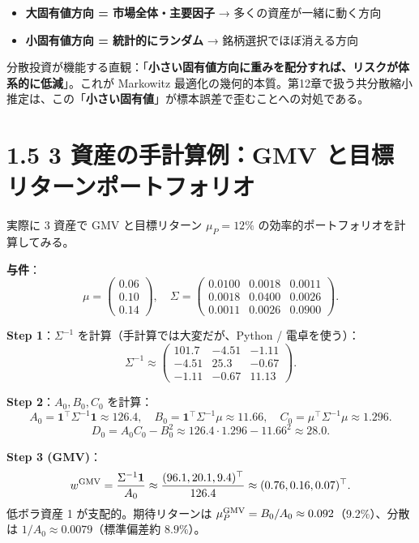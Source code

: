 \documentclass[11pt,a4paper]{report}
\begin{document}
\begin{itemize}
\item \textbf{大固有値方向 = 市場全体・主要因子} → 多くの資産が一緒に動く方向
\item \textbf{小固有値方向 = 統計的にランダム} → 銘柄選択でほぼ消える方向
\end{itemize}

分散投資が機能する直観：「\textbf{小さい固有値方向に重みを配分すれば、リスクが体系的に低減}」。これが Markowitz 最適化の幾何的本質。第12章で扱う共分散縮小推定は、この「\textbf{小さい固有値}」が標本誤差で歪むことへの対処である。

\section{1.5 3 資産の手計算例：GMV と目標リターンポートフォリオ}

実際に 3 資産で GMV と目標リターン $\mu_P = 12\%$ の効率的ポートフォリオを計算してみる。

\textbf{与件}： \[ \mu = \begin{pmatrix} 0.06 \\ 0.10 \\ 0.14 \end{pmatrix},\quad \Sigma = \begin{pmatrix} 0.0100 & 0.0018 & 0.0011 \\ 0.0018 & 0.0400 & 0.0026 \\ 0.0011 & 0.0026 & 0.0900 \end{pmatrix}. \]

\textbf{Step 1}：$\Sigma^{-1}$ を計算（手計算では大変だが、Python / 電卓を使う）： \[ \Sigma^{-1} \approx \begin{pmatrix} 101.7 & -4.51 & -1.11 \\ -4.51 & 25.3 & -0.67 \\ -1.11 & -0.67 & 11.13 \end{pmatrix}. \]

\textbf{Step 2}：$A_0, B_0, C_0$ を計算： \[ A_0 = \mathbf{1}^\top \Sigma^{-1} \mathbf{1} \approx 126.4,\quad B_0 = \mathbf{1}^\top \Sigma^{-1} \mu \approx 11.66, \quad C_0 = \mu^\top \Sigma^{-1} \mu \approx 1.296. \] \[ D_0 = A_0 C_0 - B_0^2 \approx 126.4 \cdot 1.296 - 11.66^2 \approx 28.0. \]

\textbf{Step 3 (GMV)}： \[ w^{\rm GMV} = \frac{\Sigma^{-1} \mathbf{1}}{A_0} \approx \frac{(96.1, 20.1, 9.4)^\top}{126.4} \approx (0.76, 0.16, 0.07)^\top. \] 低ボラ資産 1 が支配的。期待リターンは $\mu_P^{\rm GMV} = B_0/A_0 \approx 0.092$（9.2\%）、分散は $1/A_0 \approx 0.0079$（標準偏差約 $8.9\%$）。
\end{document}
